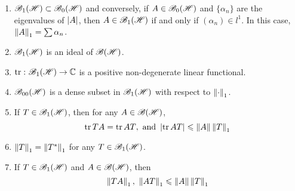 \documentclass[a4paper,11pt]{report}
\begin{document}
\begin{thm}
	\begin{enumerate}[label=\arabic*)]
		\item $\toper \subset \coper$ and conversely, if $A \in \coper$ and $\{\alpha_n\}$ are the eigenvalues of $\abs{A}$, then $A \in \toper$ if and only if $(\alpha_n) \in l^{1}$. In this case, $\norm{A}_1 = \sum \alpha_n$.
		\item $\toper$ is an ideal of $\oper$.
		\item $\tr{} \colon \toper \sto \C$ is a positive non-degenerate linear functional.
		\item $\foper$ is a dense subset in $\toper$ with respect to $\norm{\cdot}_1$.
		\item If $T \in \toper$, then for any $A \in \oper$,
		\begin{equation*}
			\tr{TA} = \tr{AT},~\text{and } \abs{\tr{AT}} \leqslant \norm{A}\norm{T}_1
		\end{equation*}
		\item $\norm{T}_1 = \norm{\st{T}}_1$ for any $T \in \toper$.
		\item If $T \in \toper$ and $A \in \oper$, then
		\begin{equation*}
			\norm{TA}_1,~ \norm{AT}_1 \leqslant \norm{A} \norm{T}_1
		\end{equation*}
	\end{enumerate}
\end{thm}
\end{document}
